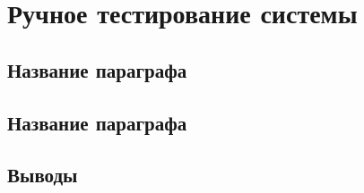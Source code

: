\chapter{Ручное тестирование системы} \label{ch4}
	
\section{Название параграфа} \label{ch4:sec1}

\section{Название параграфа} \label{ch4:sec2}

\section{Выводы} \label{ch4:conclusion}

\newpage